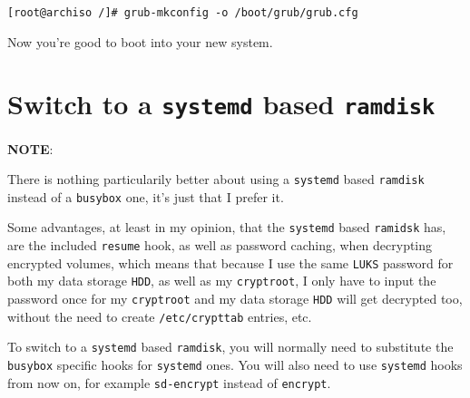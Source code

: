 \documentclass[9pt]{report}
\newcommand{\admonition}[2]{\textbf{#1}: {#2}}
\begin{document}
\begin{verbatim}
[root@archiso /]# grub-mkconfig -o /boot/grub/grub.cfg
\end{verbatim}

Now you’re good to boot into your new system.



\vfill\eject

\hypertarget{x-switch-to-a-systemd-based-ramdisk}{\section{Switch to a \texttt{systemd} based \texttt{ramdisk}}}
\admonition{NOTE}{There is nothing particularily better about using a \texttt{systemd} based \texttt{ramdisk} instead of a \texttt{busybox} one, it’s just that I prefer it.


Some advantages, at least in my opinion, that the \texttt{systemd} based \texttt{ramidsk} has, are the included \texttt{resume} hook, as well as password caching, when decrypting encrypted volumes, which means that because I use the same \texttt{LUKS} password for both my data storage \texttt{HDD}, as well as my \texttt{cryptroot}, I only have to input the password once for my \texttt{cryptroot} and my data storage \texttt{HDD} will get decrypted too, without the need to create \texttt{/etc/crypttab} entries, etc.

}
To switch to a \texttt{systemd} based \texttt{ramdisk}, you will normally need to substitute the \texttt{busybox} specific hooks for \texttt{systemd} ones.
You will also need to use \texttt{systemd} hooks from now on, for example \texttt{sd-encrypt} instead of \texttt{encrypt}.
\end{document}
